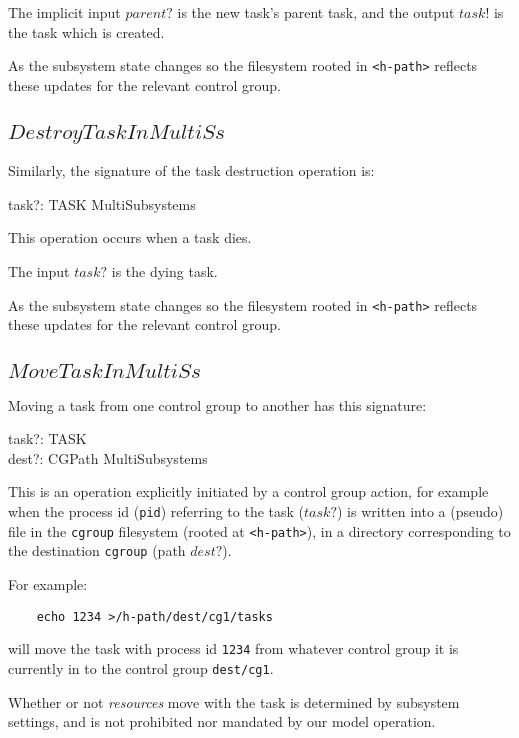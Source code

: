 \documentclass[a4paper,twoside,12pt]{article}
\begin{document}
The implicit input $parent?$ is the new task's parent task, and the output $task!$ is the task which is created.

As the subsystem state changes so the
filesystem rooted in \texttt{<h-path>} reflects these updates for the relevant control group.

\subsection{$DestroyTaskInMultiSs$}

Similarly, the signature of the task destruction operation is:
\begin{schema*}
    task?: TASK
\also 
    \Delta MultiSubsystems
\end{schema*}
This operation occurs when a task dies.

The input $task?$ is the dying task.

As the subsystem state changes so the
filesystem rooted in \texttt{<h-path>} reflects these updates for the relevant control group.


\subsection{$MoveTaskInMultiSs$}

Moving a task from one control group to another has this signature:
\begin{schema*}
    task?: TASK \\
    dest?: CGPath
\also 
    \Delta MultiSubsystems
\end{schema*}
This is an operation explicitly initiated by a control group action, for example when
the process id (\texttt{pid}) referring to the task ($task?$) is written into a 
(pseudo) file in the \texttt{cgroup} filesystem 
(rooted at \texttt{<h-path>}),
in a directory corresponding to the destination \texttt{cgroup} (path $dest?$).

For example:
\begin{verbatim}
    echo 1234 >/h-path/dest/cg1/tasks
\end{verbatim}
will move the task with process id \texttt{1234} from whatever control group it is currently in to 
the control group \texttt{dest/cg1}.

Whether or not \emph{resources} move with the task is determined by subsystem settings, and is not
prohibited nor mandated by our model operation.
\end{document}
